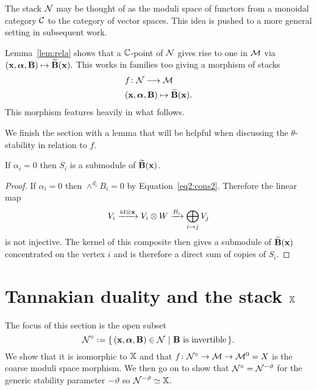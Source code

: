 \documentclass{amsart}
\newcommand{\balpha}{\boldsymbol{\alpha}}
\theoremstyle{definition}
\begin{document}
\begin{remark}
The stack $\mathcal{N}$ may be thought of as the moduli space of functors from a monoidal category $\mathcal{C}$ to the category of vector spaces.
This idea is pushed to a more general setting in subsequent work.
\end{remark}

Lemma~\ref{lem:rela} shows that a $\mathbb{C}$-point of $\mathcal{N}$ gives rise to one in $\mathcal{M}$ via $(\bfx, \balpha, \bfB) \mapsto \widetilde{\bfB}(\bfx).$
This works in families too giving a morphism of stacks
\begin{align*}
    & f \colon \cN \longrightarrow \cM \\
    & (\bfx, \balpha, \bfB) \mapsto \widetilde{\bfB}(\bfx).
\end{align*}
This morphism features heavily in what follows.

We finish the section with a lemma that will be helpful when discussing the $\theta$-stability in relation to $f$.

\begin{lemma}\label{lem:Si}
If $\alpha_i=0$ then $S_i$ is a submodule of $\widetilde{\mathbf{B}}(\mathbf{x})$.
\end{lemma}

\begin{proof}
If $\alpha_i=0$ then $\wedge^{d_i} B_i=0$ by Equation~\ref{eq2:cons2}.
Therefore the linear map $$V_{i} \xrightarrow{\textup{id} \otimes \mathbf{x}} V_{i} \otimes W \xrightarrow{B_{i}} \bigoplus_{i \rightarrow j} V_j$$ is not injective.
The kernel of this composite then gives a submodule of $\widetilde{\mathbf{B}}(\mathbf{x})$ concentrated on the vertex $i$ and is therefore a direct sum of copies of $S_i$.
\end{proof}


\section{Tannakian duality and the stack $\mathbb{X}$}

The focus of this section is the open subset $$\cN^\circ:= \{\,(\bfx, \balpha, \bfB) \in \cN \,\,|\,\, \bfB \text{ is invertible} \,\}.$$
We show that it is isomorphic to $\mathbb{X}$ and that $f \colon \mathcal{N}^\circ \rightarrow \mathcal{M} \rightarrow \mathcal{M}^0=X$ is the coarse moduli space morphism.
We then go on to show that $\mathcal{N}^\circ = \mathcal{N}^{-\vartheta}$ for the generic stability parameter $-\vartheta$ so $\mathcal{N}^{-\vartheta} \simeq \mathbb{X}$.
\end{document}
